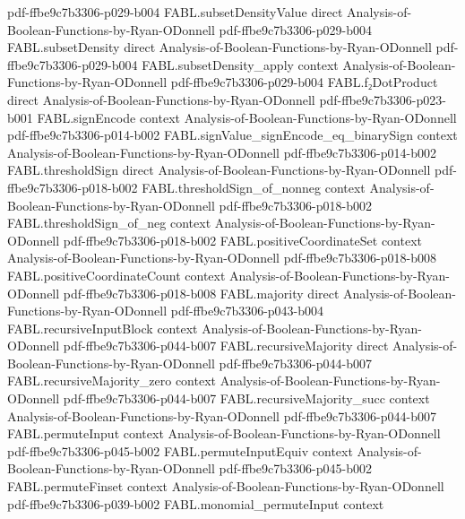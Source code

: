 \begin{theorem}
  {pdf-ffbe9c7b3306-p029-b004}
\proofstep
  {FABL.subsetDensityValue}
  {direct}
  {Analysis-of-Boolean-Functions-by-Ryan-ODonnell}
  {pdf-ffbe9c7b3306-p029-b004}
\proofstep
  {FABL.subsetDensity}
  {direct}
  {Analysis-of-Boolean-Functions-by-Ryan-ODonnell}
  {pdf-ffbe9c7b3306-p029-b004}
\proofstep
  {FABL.subsetDensity_apply}
  {context}
  {Analysis-of-Boolean-Functions-by-Ryan-ODonnell}
  {pdf-ffbe9c7b3306-p029-b004}
\proofstep
  {FABL.f₂DotProduct}
  {direct}
  {Analysis-of-Boolean-Functions-by-Ryan-ODonnell}
  {pdf-ffbe9c7b3306-p023-b001}
\proofstep
  {FABL.signEncode}
  {context}
  {Analysis-of-Boolean-Functions-by-Ryan-ODonnell}
  {pdf-ffbe9c7b3306-p014-b002}
\proofstep
  {FABL.signValue_signEncode_eq_binarySign}
  {context}
  {Analysis-of-Boolean-Functions-by-Ryan-ODonnell}
  {pdf-ffbe9c7b3306-p014-b002}
\proofstep
  {FABL.thresholdSign}
  {direct}
  {Analysis-of-Boolean-Functions-by-Ryan-ODonnell}
  {pdf-ffbe9c7b3306-p018-b002}
\proofstep
  {FABL.thresholdSign_of_nonneg}
  {context}
  {Analysis-of-Boolean-Functions-by-Ryan-ODonnell}
  {pdf-ffbe9c7b3306-p018-b002}
\proofstep
  {FABL.thresholdSign_of_neg}
  {context}
  {Analysis-of-Boolean-Functions-by-Ryan-ODonnell}
  {pdf-ffbe9c7b3306-p018-b002}
\proofstep
  {FABL.positiveCoordinateSet}
  {context}
  {Analysis-of-Boolean-Functions-by-Ryan-ODonnell}
  {pdf-ffbe9c7b3306-p018-b008}
\proofstep
  {FABL.positiveCoordinateCount}
  {context}
  {Analysis-of-Boolean-Functions-by-Ryan-ODonnell}
  {pdf-ffbe9c7b3306-p018-b008}
\proofstep
  {FABL.majority}
  {direct}
  {Analysis-of-Boolean-Functions-by-Ryan-ODonnell}
  {pdf-ffbe9c7b3306-p043-b004}
\proofstep
  {FABL.recursiveInputBlock}
  {context}
  {Analysis-of-Boolean-Functions-by-Ryan-ODonnell}
  {pdf-ffbe9c7b3306-p044-b007}
\proofstep
  {FABL.recursiveMajority}
  {direct}
  {Analysis-of-Boolean-Functions-by-Ryan-ODonnell}
  {pdf-ffbe9c7b3306-p044-b007}
\proofstep
  {FABL.recursiveMajority_zero}
  {context}
  {Analysis-of-Boolean-Functions-by-Ryan-ODonnell}
  {pdf-ffbe9c7b3306-p044-b007}
\proofstep
  {FABL.recursiveMajority_succ}
  {context}
  {Analysis-of-Boolean-Functions-by-Ryan-ODonnell}
  {pdf-ffbe9c7b3306-p044-b007}
\proofstep
  {FABL.permuteInput}
  {context}
  {Analysis-of-Boolean-Functions-by-Ryan-ODonnell}
  {pdf-ffbe9c7b3306-p045-b002}
\proofstep
  {FABL.permuteInputEquiv}
  {context}
  {Analysis-of-Boolean-Functions-by-Ryan-ODonnell}
  {pdf-ffbe9c7b3306-p045-b002}
\proofstep
  {FABL.permuteFinset}
  {context}
  {Analysis-of-Boolean-Functions-by-Ryan-ODonnell}
  {pdf-ffbe9c7b3306-p039-b002}
\proofstep
  {FABL.monomial_permuteInput}
  {context}

\end{theorem}
